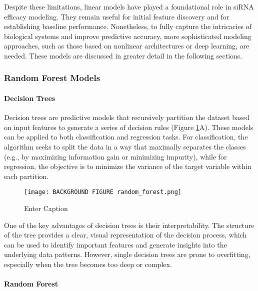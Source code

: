 \documentclass{report}
\begin{document}
Despite these limitations, linear models have played a foundational role in siRNA efficacy modeling. They remain useful for initial feature discovery and for establishing baseline performance. Nonetheless, to fully capture the intricacies of biological systems and improve predictive accuracy, more sophisticated modeling approaches, such as those based on nonlinear architectures or deep learning, are needed. These models are discussed in greater detail in the following sections.

\subsubsection{Random Forest Models}
\paragraph{Decision Trees}
Decision trees are predictive models that recursively partition the dataset based on input features to generate a series of decision rules (Figure \ref{fig:random forest}A). These models can be applied to both classification and regression tasks. For classification, the algorithm seeks to split the data in a way that maximally separates the classes (e.g., by maximizing information gain or minimizing impurity), while for regression, the objective is to minimize the variance of the target variable within each partition.

\begin{figure}
    \centering
    \texttt{[image: BACKGROUND FIGURE random\_forest.png]}
    \caption{Enter Caption}
    \label{fig:random forest}
\end{figure}

One of the key advantages of decision trees is their interpretability. The structure of the tree provides a clear, visual representation of the decision process, which can be used to identify important features and generate insights into the underlying data patterns. However, single decision trees are prone to overfitting, especially when the tree becomes too deep or complex.



\paragraph{Random Forest}
\end{document}
